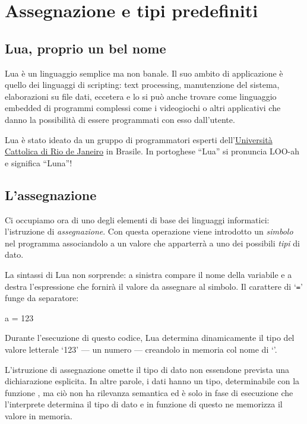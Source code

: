 
\chapter{Assegnazione e tipi predefiniti}
\label{iiChAssignment}


\section{Lua, proprio un bel nome}

Lua è un linguaggio semplice ma non banale. Il suo ambito di applicazione è
quello dei linguaggi di scripting: text processing, manutenzione del sistema,
elaborazioni su file dati, eccetera e lo si può anche trovare come linguaggio
embedded di programmi complessi come i videogiochi o altri applicativi
che danno la possibilità di essere programmati con esso dall'utente.

Lua è stato ideato da un gruppo di programmatori esperti
dell'\href{http://www.puc-rio.br/index.html}{Università Cattolica di Rio de
Janeiro} in Brasile. In portoghese ``Lua'' si pronuncia LOO-ah e significa
``Luna''!


\section{L'assegnazione}
\label{iiSecAssegnazione}

Ci occupiamo ora di uno degli elementi di base dei linguaggi informatici:
l'istruzione di \emph{assegnazione}. Con questa operazione viene introdotto un
\emph{simbolo} nel programma associandolo a un valore che apparterrà a uno
dei possibili \emph{tipi} di dato.

La sintassi di Lua non sorprende: a sinistra compare il nome della variabile e
a destra l'espressione che fornirà il valore da assegnare al simbolo. Il
carattere di `\texttt{=}' funge da separatore:
\begin{lines}
a = 123
\end{lines}

Durante l'esecuzione di questo codice, Lua determina dinamicamente il tipo del
valore letterale `123' --- un numero --- creandolo in memoria col nome di
`'.

L'istruzione di assegnazione omette il tipo di dato non essendone prevista una
dichiarazione esplicita. In altre parole, i dati hanno un tipo, determinabile
con la funzione , ma ciò non ha rilevanza semantica ed è
solo in fase di esecuzione che l'interprete determina il tipo di dato e in
funzione di questo ne memorizza il valore in memoria.

